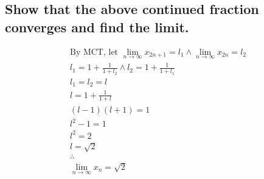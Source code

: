 \documentclass[letterpaper]{article}
\begin{document}
\subsection{Show that the above continued fraction converges and find the limit.}
\begin{gather*}
\text{By MCT, let }\lim_{n\rightarrow\infty}x_{2n+1}=l_1 \land \lim_{n\rightarrow\infty}x_{2n}=l_2 \\
l_1=1+\frac{1}{1+l_2} \land l_2=1+\frac{1}{1+l_1} \\
l_1=l_2=l \\
l=1+\frac{1}{1+l} \\
(l-1)(l+1)=1 \\
l^2-1=1 \\
l^2=2 \\
l=\sqrt{2} \\
\therefore \\
\boxed{\lim_{n\rightarrow\infty}x_n=\sqrt{2}}
\end{gather*}
\end{document}
